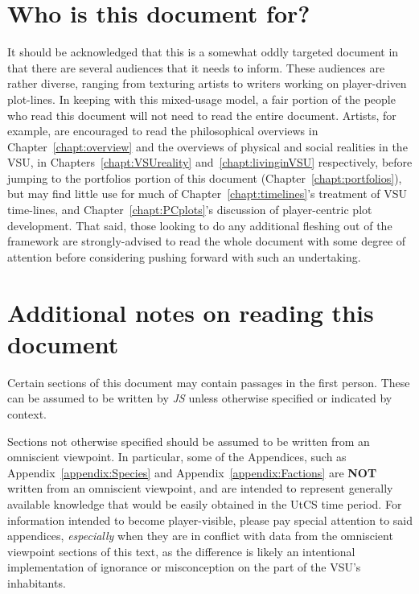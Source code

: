 \section*{Who is this document for?}
It should be acknowledged that this is a somewhat oddly targeted
document in that there are several audiences that it needs to inform. These
audiences are rather diverse, ranging from texturing artists to
writers working on player-driven plot-lines. In keeping with this
mixed-usage model, a fair portion of the people who read this document
will not need to read the entire document. Artists, for example, are
encouraged to read the philosophical overviews in Chapter~\ref{chapt:overview} and the overviews of physical and social realities in the VSU, in Chapters~\ref{chapt:VSUreality} and~\ref{chapt:livinginVSU} respectively,
before jumping to the portfolios portion of this document
(Chapter~\ref{chapt:portfolios}), but may find little use for much of
Chapter~\ref{chapt:timelines}'s treatment of VSU time-lines, and Chapter~\ref{chapt:PCplots}'s discussion of player-centric plot development. That said,
those looking to do any additional fleshing out of the framework are
strongly-advised to read the whole document with some degree of
attention before considering pushing forward with such an undertaking.

\section*{Additional notes on reading this document}
Certain sections of this document may contain passages in the first
person. These can be assumed to be written by {\it JS} unless
otherwise specified or indicated by context. 

Sections not otherwise
specified should be assumed to be written from an omniscient
viewpoint. In particular, some of the Appendices, such as Appendix~\ref{appendix:Species} and Appendix~\ref{appendix:Factions} are {\bf NOT}
written from an omniscient viewpoint, and are intended to represent
generally available knowledge that would be easily obtained in the
UtCS time period. For information intended to become player-visible, please
pay special attention to said appendices, {\it especially} when they
are in conflict with data from the omniscient viewpoint sections of
this text, as the difference is likely an intentional implementation
of ignorance or misconception on the part of the VSU's inhabitants.

